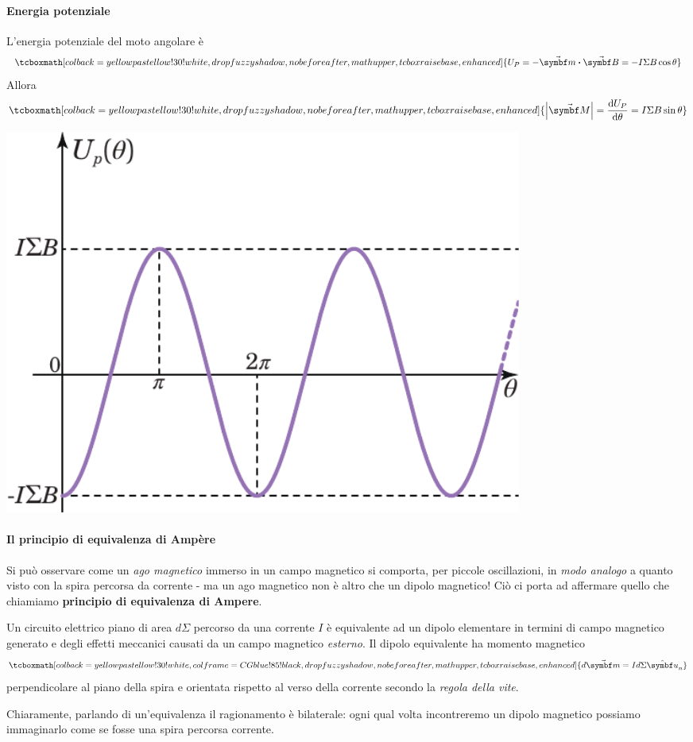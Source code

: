 \paragraph{Energia potenziale}
L'energia potenziale del moto angolare è
\begin{equation}
	\tcboxmath[colback=yellowpastellow!30!white,drop fuzzy shadow, nobeforeafter, math upper, tcbox raise base, enhanced]{U_P=-\vba{m}\vdot\vba{B}=-I\Sigma B\cos\theta}
\end{equation}
Allora
\begin{equation}
	\tcboxmath[colback=yellowpastellow!30!white,drop fuzzy shadow, nobeforeafter, math upper, tcbox raise base, enhanced]{\abs{\vba{M}}=\dv{U_P}{\theta}=I\Sigma B\sin\theta}
\end{equation}\label{EnergiaPotenzialeCasoGeneralemanontroppo}
\begin{center}
	\includegraphics[width=0.75\textwidth]{images/chp7/chp7graficoenergiapot.pdf}
\end{center}
\paragraph{Il principio di equivalenza di Ampère}\label{principio di equivalenza di ampere}
Si può osservare come un \textit{ago magnetico} immerso in un campo magnetico si comporta, per piccole oscillazioni, in \textit{modo analogo} a quanto visto con la spira percorsa da corrente - ma un ago magnetico non è altro che un dipolo magnetico! Ciò ci porta ad affermare quello che chiamiamo \textbf{principio di equivalenza di Ampere}.
\begin{principle}
	Un circuito elettrico piano di area $d\Sigma$ percorso da una corrente $I$ è equivalente ad un dipolo elementare in termini di campo magnetico generato e degli effetti meccanici causati da un campo magnetico \textit{esterno}. Il dipolo equivalente ha momento magnetico
	\begin{equation}
		\tcboxmath[colback=yellowpastellow!30!white,colframe=CGblue!85!black,drop fuzzy shadow, nobeforeafter, math upper, tcbox raise base, enhanced]{d\vba{m}=Id\Sigma \vbh{u}_n}
	\end{equation}
	perpendicolare al piano della spira e orientata rispetto al verso della corrente secondo la \textit{regola della vite}.
\end{principle}
Chiaramente, parlando di un'equivalenza il ragionamento è bilaterale: ogni qual volta incontreremo un dipolo magnetico possiamo immaginarlo come se fosse una spira percorsa corrente.
